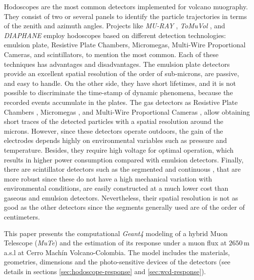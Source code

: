 \documentclass[submitting]{nst}
\begin{document}
Hodoscopes are the most common detectors implemented for volcano muography.  They consist of two or several panels to identify the particle trajectories in terms of the zenith and azimuth angles. Projects like \textsl{MU-RAY} \cite{AnastasioEtal2013}, \textsl{ToMuVol} \cite{CarloganuEtal2013}, and \textsl{DIAPHANE} \cite{LesparreEtal2010} employ hodoscopes based on different detection technologies: emulsion plate, Resistive Plate Chambers, Micromegas, Multi-Wire Proportional Cameras, and scintillators, to mention the most common. Each of these techniques has advantages and disadvantages. The emulsion plate detectors \cite{MorishimaEtal2017, Nagamine2016} provide an excellent spatial resolution of the order of sub-microns, are passive, and easy to handle. On the other side, they have short lifetimes, and it is not possible to discriminate the time-stamp of dynamic phenomena, because the recorded events accumulate in the plates. The gas detectors as Resistive Plate Chambers \cite{SehgalEtal2016, Fehr2012}, Micromegas \cite{BouteilleEtal2016}, and Multi-Wire Proportional Cameras \cite{OlahEtal2018}, allow obtaining short traces of the detected particles with a spatial resolution around the microns. However, since these detectors operate outdoors, the gain of the electrodes depends highly on environmental variables such as pressure and temperature. Besides, they require high voltage for optimal operation, which results in higher power consumption compared with emulsion detectors. Finally, there are scintillator detectors such as the segmented \cite{FujiiEtal2013, LesparreEtal2012, TanakaEtal2009} and continuous \cite{NagamineEtal1995, AguiarEtal2015, TangEtal2016},  that are more robust since these do not have a high mechanical variation with environmental conditions, are easily constructed at a much lower cost than gaseous and emulsion detectors. Nevertheless, their spatial resolution is not as good as the other detectors since the segments generally used are of the order of centimeters.

This paper presents the computational \textsl{Geant4} modeling of a hybrid Muon Telescope (\textsl{MuTe}) and the estimation of its response under a muon flux at $2650$\,m a.s.l at Cerro Machín Volcano-Colombia. The model includes the materials, geometries, dimensions and the photo-sensitive devices of the detectors (see details in sections \ref{sec:hodoscope-response} and \ref{sec:wcd-response}). 

\end{document}
